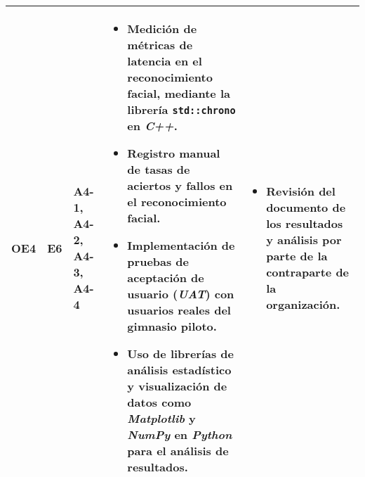 \begin{landscape}
\begin{longtable}{l|l|p{2.5cm}|p{7cm}|p{7cm}}
        OE4 & E6 & A4-1, A4-2, A4-3, A4-4 & \vspace{-\baselineskip}
         \setlength{\leftmargini}{1em}
         \begin{itemize}
            \item Medición de métricas de latencia en el reconocimiento facial, mediante la librería \texttt{std::chrono} en \textit{C++}.
            \item Registro manual de tasas de aciertos y fallos en el reconocimiento facial.
            \item Implementación de pruebas de aceptación de usuario (\textit{UAT}) con usuarios reales del gimnasio piloto.
            \item Uso de librerías de análisis estadístico y visualización de datos como \textit{Matplotlib} y \textit{NumPy} en \textit{Python} para el análisis de resultados.
         \end{itemize}
        & \vspace{-\baselineskip}
         \setlength{\leftmargini}{1em}
         \begin{itemize}
            \item Revisión del documento de los resultados y análisis por parte de la contraparte de la organización. 
         \end{itemize}\\
        \hline

    \end{longtable}
\end{landscape} %


